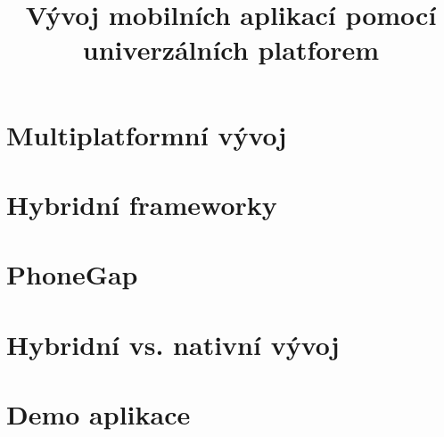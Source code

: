 \documentclass[thesis=B,czech]{FITthesis}[2012/06/26]
\title{Vývoj mobilních aplikací pomocí univerzálních platforem}
\begin{document}

\begin{introduction}
	
\end{introduction}

% 	

% 	

\chapter{Multiplatformní vývoj}
	
	\let\cleardoublepage\clearpage

\chapter{Hybridní frameworky} \label{Chap:HybridniFrameworky}
	
	\let\cleardoublepage\clearpage

\chapter{PhoneGap}
	

\chapter{Hybridní vs. nativní vývoj} \label{Chap:HybridvsNative}
	

\chapter{Demo aplikace}
	
\end{document}
